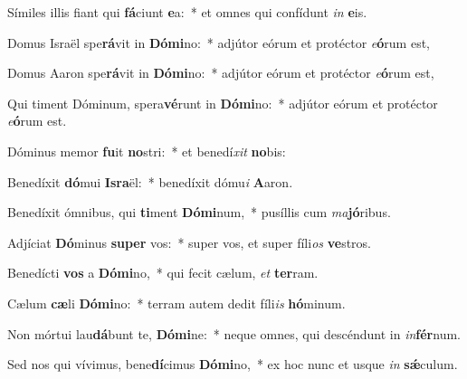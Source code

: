 \item Símiles illis fiant qui \textbf{fá}ciunt \textbf{e}a:~* et omnes qui confídunt \textit{in} \textbf{e}is.

\item Domus Israël spe\textbf{rá}vit in \textbf{Dó}\textbf{mi}no:~* adjútor eórum et protéctor \textit{e}\textbf{ó}rum est,

\item Domus Aaron spe\textbf{rá}vit in \textbf{Dó}\textbf{mi}no:~* adjútor eórum et protéctor \textit{e}\textbf{ó}rum est,

\item Qui timent Dóminum, spera\textbf{vé}runt in \textbf{Dó}\textbf{mi}no:~* adjútor eórum et protéctor \textit{e}\textbf{ó}rum est.

\item Dóminus memor \textbf{fu}it \textbf{no}stri:~* et benedí\textit{xit} \textbf{no}bis:

\item Benedíxit \textbf{dó}mui \textbf{Is}\textbf{ra}ël:~* benedíxit dómu\textit{i} \textbf{A}aron.

\item Benedíxit ómnibus, qui \textbf{ti}ment \textbf{Dó}\textbf{mi}num,~* pusíllis cum \textit{ma}\textbf{jó}ribus.

\item Adjíciat \textbf{Dó}minus \textbf{su}\textbf{per} vos:~* super vos, et super fíli\textit{os} \textbf{ve}stros.

\item Benedícti \textbf{vos} a \textbf{Dó}\textbf{mi}no,~* qui fecit cælum, \textit{et} \textbf{ter}ram.

\item Cælum \textbf{cæ}li \textbf{Dó}\textbf{mi}no:~* terram autem dedit fíli\textit{is} \textbf{hó}minum.

\item Non mórtui lau\textbf{dá}bunt te, \textbf{Dó}\textbf{mi}ne:~* neque omnes, qui descéndunt in \textit{in}\textbf{fér}num.

\item Sed nos qui vívimus, bene\textbf{dí}cimus \textbf{Dó}\textbf{mi}no,~* ex hoc nunc et usque \textit{in} \textbf{sǽ}culum.